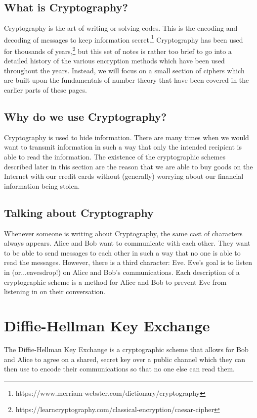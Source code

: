 \documentclass[10pt]{article}
\theoremstyle{definition}
\theoremstyle{remark}
\begin{document}
\subsection{What is Cryptography?}
Cryptography is the art of writing or solving codes.  This is the encoding and decoding of messages to keep information secret.\footnote{https://www.merriam-webster.com/dictionary/cryptography}  Cryptography has been used for thousands of years,\footnote{https://learncryptography.com/classical-encryption/caesar-cipher} but this set of notes is rather too brief to go into a detailed history of the various encryption methods which have been used throughout the years.  Instead, we will focus on a small section of ciphers which are built upon the fundamentals of number theory that have been covered in the earlier parts of these pages. 
\subsection{Why do we use Cryptography?}
Cryptography is used to hide information.  There are many times when we would want to transmit information in such a way that only the intended recipient is able to read the information.  The existence of the cryptographic schemes described later in this section are the reason that we are able to buy goods on the Internet with our credit cards without (generally) worrying about our financial information being stolen.
\subsection{Talking about Cryptography}
Whenever someone is writing about Cryptography, the same cast of characters always appears.  Alice and Bob want to communicate with each other.  They want to be able to send messages to each other in such a way that no one is able to read the messages.  However, there is a third character: Eve.  Eve's goal is to listen in (or...eavesdrop!) on Alice and Bob's communications.  Each description of a cryptographic scheme is a method for Alice and Bob to prevent Eve from listening in on their conversation.
\section{Diffie-Hellman Key Exchange}
The Diffie-Hellman Key Exchange is a cryptographic scheme that allows for Bob and Alice to agree on a shared, secret key over a public channel which they can then use to encode their communications so that no one else can read them.
\end{document}

